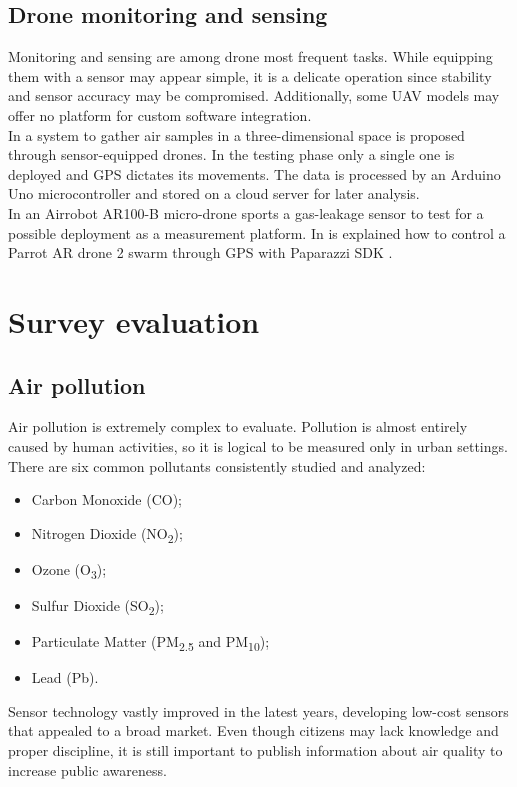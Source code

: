 \documentclass[journal]{IEEEtran}
\begin{document}
\subsection{Drone monitoring and sensing}
Monitoring and sensing are among drone most frequent tasks. While equipping them with a sensor may appear simple, it is a delicate operation since stability and sensor accuracy may be compromised. Additionally, some UAV models may offer no platform for custom software integration.
\\
In \cite{aqss} a system to gather air samples in a three-dimensional space is proposed through sensor-equipped drones. In the testing phase only a single one is deployed and GPS dictates its movements. The data is processed by an Arduino Uno \cite{arduno} microcontroller and stored on a cloud server for later analysis.
\\
In \cite{leakage} an Airrobot AR100-B micro-drone \cite{airrobot} sports a gas-leakage sensor to test for a possible deployment as a measurement platform. In \cite{parrot} is explained how to control a Parrot AR drone 2 \cite{ardrone} swarm through GPS with Paparazzi SDK \cite{paparazzi}.


\section{Survey evaluation}

\subsection{Air pollution}
Air pollution is extremely complex to evaluate. Pollution is almost entirely caused by human activities, so it is logical to be measured only in urban settings. There are six common pollutants consistently studied and analyzed:
\begin{itemize}
	\item Carbon Monoxide (CO);
    \item Nitrogen Dioxide (NO\textsubscript{2});
    \item Ozone (O\textsubscript{3});
    \item Sulfur Dioxide (SO\textsubscript{2});
    \item Particulate Matter (PM\textsubscript{2.5} and PM\textsubscript{10});
	\item Lead (Pb).
\end{itemize}
Sensor technology vastly improved in the latest years, developing low-cost sensors that appealed to a broad market. Even though citizens may lack knowledge and proper discipline, it is still important to publish information about air quality to increase public awareness.
\end{document}
